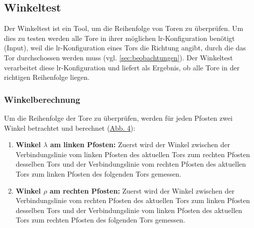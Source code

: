 \subsection{Winkeltest}
\label{sec:winkeltest}

Der Winkeltest ist ein Tool, um die Reihenfolge von Toren zu überprüfen. Um dies zu testen werden alle Tore in ihrer möglichen lr-Konfiguration benötigt (Input), weil die lr-Konfiguration eines Tors die Richtung angibt, durch die das Tor durchschossen werden muss (vgl. \ref{sec:beobachtungen}). Der Winkeltest verarbeitet diese lr-Konfiguration und liefert als Ergebnis, ob alle Tore in der richtigen Reihenfolge liegen.

\subsubsection{Winkelberechnung}
Um die Reihenfolge der Tore zu überprüfen, werden für jeden Pfosten zwei Winkel betrachtet und berechnet (\hyperref[fig:winkeltest]{Abb. 4}):
\begin{enumerate}
	\item \textbf{Winkel $\lambda$ am linken Pfosten:} Zuerst wird der Winkel zwischen der Verbindungslinie vom linken Pfosten des aktuellen Tors zum rechten Pfosten desselben Tors und der Verbindungslinie vom rechten Pfosten des aktuellen Tors zum linken Pfosten des folgenden Tors gemessen.
	\item \textbf{Winkel $\rho$ am rechten Pfosten:} Zuerst wird der Winkel zwischen der Verbindungslinie vom rechten Pfosten des aktuellen Tors zum linken Pfosten desselben Tors und der Verbindungslinie vom linken Pfosten des aktuellen Tors zum rechten Pfosten des folgenden Tors gemessen.
\end{enumerate}

